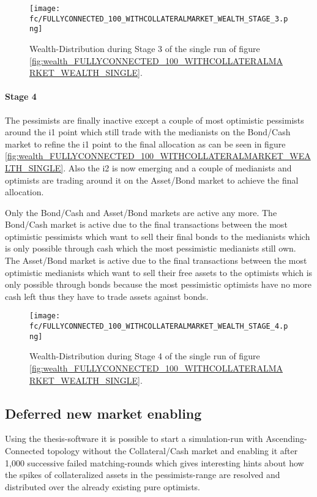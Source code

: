 \documentclass[Bachelorarbeit.tex]{subfiles}
\begin{document}
\begin{figure}[H]
	\centering
  \texttt{[image: fc/FULLYCONNECTED\_100\_WITHCOLLATERALMARKET\_WEALTH\_STAGE\_3.png]}
  	\caption{Wealth-Distribution during Stage 3 of the single run of figure \ref{fig:wealth_FULLYCONNECTED_100_WITHCOLLATERALMARKET_WEALTH_SINGLE}.}
	\label{fig:markets_FULLYCONNECTED_100_WITHCOLLATERALMARKET_WEALTH_STAGE_3}
\end{figure}

\paragraph{Stage 4}
The pessimists are finally inactive except a couple of most optimistic pessimists around the i1 point which still trade with the medianists on the Bond/Cash market to refine the i1 point to the final allocation as can be seen in figure \ref{fig:wealth_FULLYCONNECTED_100_WITHCOLLATERALMARKET_WEALTH_SINGLE}. Also the i2 is now emerging and a couple of medianists and optimists are trading around it on the Asset/Bond market to achieve the final allocation.

\medskip

Only the Bond/Cash and Asset/Bond markets are active any more. The Bond/Cash market is active due to the final transactions between the most optimistic pessimists which want to sell their final bonds to the medianists which is only possible through cash which the most pessimistic medianists still own. The Asset/Bond market is active due to the final transactions between the most optimistic medianists which want to sell their free assets to the optimists which is only possible through bonds because the most pessimistic optimists have no more cash left thus they have to trade assets against bonds.

\begin{figure}[H]
	\centering
  \texttt{[image: fc/FULLYCONNECTED\_100\_WITHCOLLATERALMARKET\_WEALTH\_STAGE\_4.png]}
  	\caption{Wealth-Distribution during Stage 4 of the single run of figure \ref{fig:wealth_FULLYCONNECTED_100_WITHCOLLATERALMARKET_WEALTH_SINGLE}.}
	\label{fig:markets_FULLYCONNECTED_100_WITHCOLLATERALMARKET_WEALTH_STAGE_4}
\end{figure}

\subsection{Deferred new market enabling}
Using the thesis-software it is possible to start a simulation-run with Ascending-Connected topology without the Collateral/Cash market and enabling it after 1,000 successive failed matching-rounds which gives interesting hints about how the spikes of collateralized assets in the pessimists-range are resolved and distributed over the already existing pure optimists.
\end{document}
